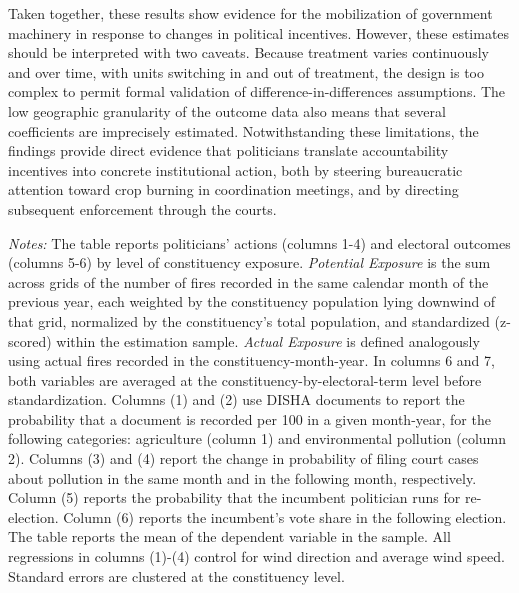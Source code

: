 \documentclass[12pt]{article}
\begin{document}
Taken together, these results show evidence for the mobilization of government machinery in response to changes in political incentives. However, these estimates should be interpreted with two caveats. Because treatment varies continuously and over time, with units switching in and out of treatment, the design is too complex to permit formal validation of difference-in-differences assumptions. The low geographic granularity of the outcome data also means that several coefficients are imprecisely estimated. Notwithstanding these limitations, the findings provide direct evidence that politicians translate accountability incentives into concrete institutional action, both by steering bureaucratic attention toward crop burning in coordination meetings, and by directing subsequent enforcement through the courts.


\begin{table}[htbp!] 
\caption{Pollution Exposure, Politicians' Actions, and Electoral Consequences, Count $\times$ Downwind Pop}\label{tab:mechanism}
        \resizebox{\linewidth}{!}{
        
        }
    \begin{minipage}{\textwidth}
        {\footnotesize \textit{Notes:} The table reports politicians' actions (columns 1-4) and electoral outcomes (columns 5-6) by level of constituency exposure.
        \textit{Potential Exposure} is the sum across grids of the number of fires  recorded in the same calendar month of the previous year, each weighted by the  constituency population lying downwind of that grid, normalized by the  constituency's total population, and standardized (z-scored) within the  estimation sample.
       \textit{Actual Exposure} is defined analogously using actual fires recorded in the   constituency-month-year. In columns 6 and 7, both variables are averaged at  the constituency-by-electoral-term level before standardization.
        Columns (1) and (2) use DISHA documents to report the probability that a document is recorded per 100 in a given month-year, for the following categories: agriculture (column 1) and environmental pollution (column 2). Columns (3) and (4) report the change in probability of filing court cases about pollution in the same month and in the following month, respectively. Column (5) reports the probability that the incumbent politician runs for re-election. Column (6) reports the incumbent's vote share in the following election.
        The table reports the mean of the dependent variable in the sample. All regressions in columns (1)-(4) control for wind direction and average wind speed. Standard errors are clustered at the constituency level.
        }
    \end{minipage}
\end{table}
\end{document}
